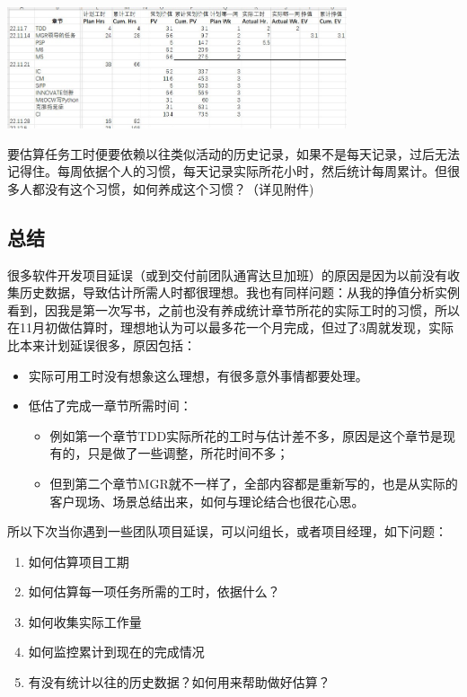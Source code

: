 {\begin{minipage}[t]{0.97\columnwidth}


\includegraphics[width=10cm]{PSPend2ndWkEvScreenshot20221126091326.jpg}

要估算任务工时便要依赖以往类似活动的历史记录，如果不是每天记录，过后无法记得住。每周依据个人的习惯，每天记录实际所花小时，然后统计每周累计。但很多人都没有这个习惯，如何养成这个习惯？（详见附件)
\strut
\end{minipage}}

\hypertarget{ux603bux7ed3}{%
\subsection{总结}\label{ux603bux7ed3}}

很多软件开发项目延误（或到交付前团队通宵达旦加班）的原因是因为以前没有收集历史数据，导致估计所需人时都很理想。我也有同样问题：从我的挣值分析实例看到，因我是第一次写书，之前也没有养成统计章节所花的实际工时的习惯，所以在11月初做估算时，理想地认为可以最多花一个月完成，但过了3周就发现，实际比本来计划延误很多，原因包括：

\begin{itemize}
\tightlist
\item
  实际可用工时没有想象这么理想，有很多意外事情都要处理。
\item
  低估了完成一章节所需时间：

  \begin{itemize}
  \tightlist
  \item
    例如第一个章节TDD实际所花的工时与估计差不多，原因是这个章节是现有的，只是做了一些调整，所花时间不多；
  \item
    但到第二个章节MGR就不一样了，全部内容都是重新写的，也是从实际的客户现场、场景总结出来，如何与理论结合也很花心思。
  \end{itemize}
\end{itemize}

所以下次当你遇到一些团队项目延误，可以问组长，或者项目经理，如下问题：

\begin{enumerate}
\tightlist
\item
  如何估算项目工期\\
\item
  如何估算每一项任务所需的工时，依据什么？\\
\item
  如何收集实际工作量\\
\item
  如何监控累计到现在的完成情况\\
\item
  有没有统计以往的历史数据？如何用来帮助做好估算？\\
\end{enumerate}

